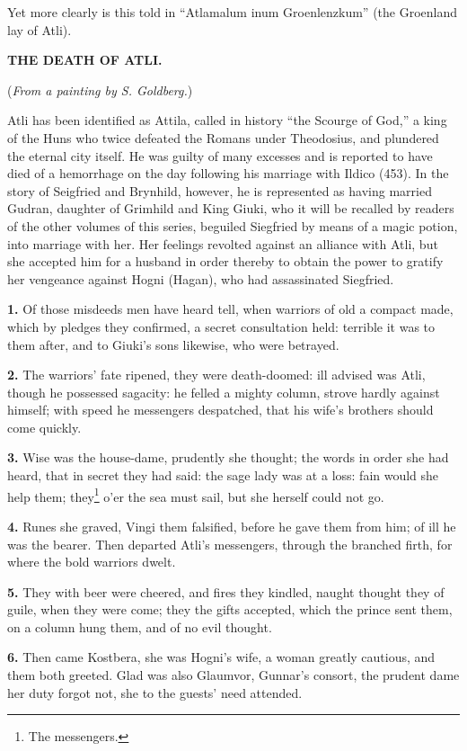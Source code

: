 Yet more clearly is this told in ``Atlamalum inum Groenlenzkum'' (the
Groenland lay of Atli).

\textbf{THE DEATH OF ATLI.}

(\emph{From a painting by S. Goldberg.})

Atli has been identified as Attila, called in history ``the Scourge of
God,'' a king of the Huns who twice defeated the Romans under
Theodosius, and plundered the eternal city itself. He was guilty of
many excesses and is reported to have died of a hemorrhage on the day
following his marriage with Ildico (453). In the story of Seigfried
and Brynhild, however, he is represented as having married Gudran,
daughter of Grimhild and King Giuki, who it will be recalled by
readers of the other volumes of this series, beguiled Siegfried by
means of a magic potion, into marriage with her. Her feelings revolted
against an alliance with Atli, but she accepted him for a husband in
order thereby to obtain the power to gratify her vengeance against
Hogni (Hagan), who had assassinated Siegfried.


\textbf{1.} Of those misdeeds men have heard tell, when warriors of old a
compact made, which by pledges they confirmed, a secret consultation
held: terrible it was to them after, and to Giuki's sons likewise, who
were betrayed.

\textbf{2.} The warriors' fate ripened, they were death-doomed: ill advised
was Atli, though he possessed sagacity: he felled a mighty column,
strove hardly against himself; with speed he messengers despatched,
that his wife's brothers should come quickly.

\textbf{3.} Wise was the house-dame, prudently she thought; the words in
order she had heard, that in secret they had said: the sage lady was
at a loss: fain would she help them; they\footnote{The messengers.} o'er the sea must sail,
but she herself could not go.

\textbf{4.} Runes she graved, Vingi them falsified, before he gave them from
him; of ill he was the bearer. Then departed Atli's messengers,
through the branched firth, for where the bold warriors dwelt.

\textbf{5.} They with beer were cheered, and fires they kindled, naught
thought they of guile, when they were come; they the gifts accepted,
which the prince sent them, on a column hung them, and of no evil
thought.

\textbf{6.} Then came Kostbera, she was Hogni's wife, a woman greatly
cautious, and them both greeted. Glad was also Glaumvor, Gunnar's
consort, the prudent dame her duty forgot not, she to the guests' need
attended.

